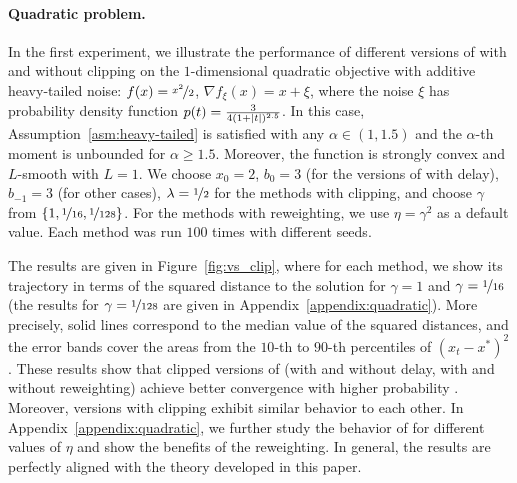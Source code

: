 \documentclass{article}
\begin{document}
\paragraph{Quadratic problem.} In the first experiment, we illustrate the performance of different versions of  with and without clipping on the $1$-dimensional quadratic objective with additive heavy-tailed noise: $f(x) = \nicefrac{x^2}{2}$, $\nabla f_{\xi}(x) = x + \xi$, where the noise $\xi$ has probability density function $p(t) = \frac{3}{4(1+\left\lvert t\right\rvert)^{2.5}}$. In this case, Assumption~\ref{asm:heavy-tailed} is satisfied with any $\alpha \in (1,1.5)$ and the $\alpha$-th moment is unbounded for $\alpha \geq 1.5$. Moreover, the function is strongly convex and $L$-smooth with $L = 1$. We choose $x_0 = 2$, $b_0 = 3$ (for the versions of  with delay), $b_{-1} = 3$ (for other cases), $\lambda = \nicefrac{1}{2}$ for the methods with clipping, and choose $\gamma$ from $\{1, \nicefrac{1}{16}, \nicefrac{1}{128}\}$. For the methods with reweighting, we use $\eta = \gamma^2$ as a default value. Each method was run $100$ times with different seeds.

The results are given in Figure~\ref{fig:vs_clip}, where for each method, we show its trajectory in terms of the squared distance to the solution for $\gamma = 1$ and $\gamma = \nicefrac{1}{16}$ (the results for $\gamma = \nicefrac{1}{128}$ are given in Appendix~\ref{appendix:quadratic}). More precisely, solid lines correspond to the median value of the squared distances, and the error bands cover the areas from the $10$-th to $90$-th percentiles of $(x_t - x^*)^2$. These results show that clipped versions of  (with and without delay, with and without reweighting) achieve better convergence with higher probability . Moreover, versions with clipping exhibit similar behavior to each other. In  Appendix~\ref{appendix:quadratic}, we further study the behavior of  for different values of $\eta$ and show the benefits of the reweighting. In general, the  results  are perfectly aligned with the theory developed in this paper.
\end{document}
